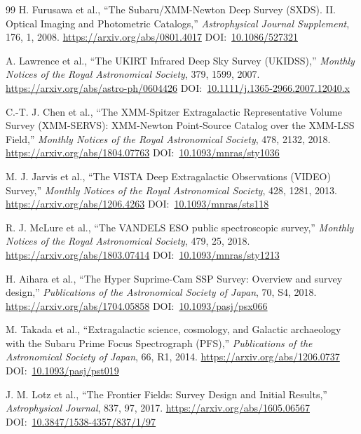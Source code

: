 \documentclass[10pt,onecolumn]{article}
\newcommand{\doi}[1]{DOI:~\href{https://doi.org/#1}{#1}}
\begin{document}
\begin{thebibliography}{99}
H. Furusawa et al.,
``The Subaru/XMM-Newton Deep Survey (SXDS). II. Optical Imaging and Photometric Catalogs,''
\emph{Astrophysical Journal Supplement}, 176, 1, 2008.
\url{https://arxiv.org/abs/0801.4017}
\doi{10.1086/527321}

A. Lawrence et al.,
``The UKIRT Infrared Deep Sky Survey (UKIDSS),''
\emph{Monthly Notices of the Royal Astronomical Society}, 379, 1599, 2007.
\url{https://arxiv.org/abs/astro-ph/0604426}
\doi{10.1111/j.1365-2966.2007.12040.x}

C.-T. J. Chen et al.,
``The XMM-Spitzer Extragalactic Representative Volume Survey (XMM-SERVS): XMM-Newton Point-Source Catalog over the XMM-LSS Field,''
\emph{Monthly Notices of the Royal Astronomical Society}, 478, 2132, 2018.
\url{https://arxiv.org/abs/1804.07763}
\doi{10.1093/mnras/sty1036}

M. J. Jarvis et al.,
``The VISTA Deep Extragalactic Observations (VIDEO) Survey,''
\emph{Monthly Notices of the Royal Astronomical Society}, 428, 1281, 2013.
\url{https://arxiv.org/abs/1206.4263}
\doi{10.1093/mnras/sts118}

R. J. McLure et al.,
``The VANDELS ESO public spectroscopic survey,''
\emph{Monthly Notices of the Royal Astronomical Society}, 479, 25, 2018.
\url{https://arxiv.org/abs/1803.07414}
\doi{10.1093/mnras/sty1213}

H. Aihara et al.,
``The Hyper Suprime-Cam SSP Survey: Overview and survey design,''
\emph{Publications of the Astronomical Society of Japan}, 70, S4, 2018.
\url{https://arxiv.org/abs/1704.05858}
\doi{10.1093/pasj/psx066}

M. Takada et al.,
``Extragalactic science, cosmology, and Galactic archaeology with the Subaru Prime Focus Spectrograph (PFS),''
\emph{Publications of the Astronomical Society of Japan}, 66, R1, 2014.
\url{https://arxiv.org/abs/1206.0737}
\doi{10.1093/pasj/pst019}

J. M. Lotz et al.,
``The Frontier Fields: Survey Design and Initial Results,''
\emph{Astrophysical Journal}, 837, 97, 2017.
\url{https://arxiv.org/abs/1605.06567}
\doi{10.3847/1538-4357/837/1/97}

\end{thebibliography}
\end{document}
